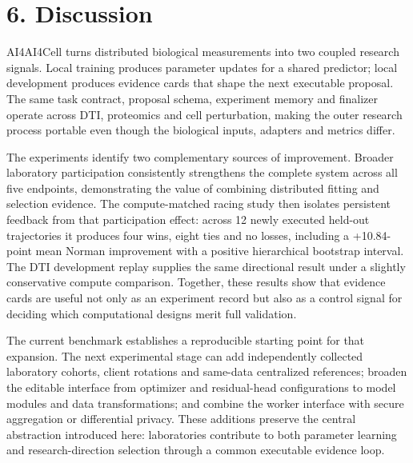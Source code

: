 \section*{6. Discussion}
AI4AI4Cell turns distributed biological measurements into two coupled research signals. Local training produces parameter updates for a shared predictor; local development produces evidence cards that shape the next executable proposal. The same task contract, proposal schema, experiment memory and finalizer operate across DTI, proteomics and cell perturbation, making the outer research process portable even though the biological inputs, adapters and metrics differ.

The experiments identify two complementary sources of improvement. Broader laboratory participation consistently strengthens the complete system across all five endpoints, demonstrating the value of combining distributed fitting and selection evidence. The compute-matched racing study then isolates persistent feedback from that participation effect: across 12 newly executed held-out trajectories it produces four wins, eight ties and no losses, including a +10.84-point mean Norman improvement with a positive hierarchical bootstrap interval. The DTI development replay supplies the same directional result under a slightly conservative compute comparison. Together, these results show that evidence cards are useful not only as an experiment record but also as a control signal for deciding which computational designs merit full validation.

The current benchmark establishes a reproducible starting point for that expansion. The next experimental stage can add independently collected laboratory cohorts, client rotations and same-data centralized references; broaden the editable interface from optimizer and residual-head configurations to model modules and data transformations; and combine the worker interface with secure aggregation or differential privacy. These additions preserve the central abstraction introduced here: laboratories contribute to both parameter learning and research-direction selection through a common executable evidence loop.
